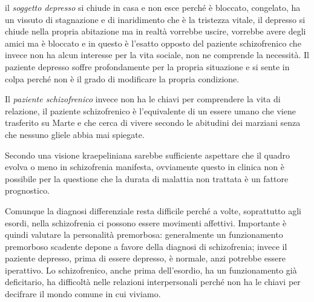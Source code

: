 \documentclass[]{article}
\begin{document}
il \emph{soggetto depresso} si chiude in casa e non esce perché è
bloccato, congelato, ha un vissuto di stagnazione e di inaridimento che
è la tristezza vitale, il depresso si chiude nella propria abitazione ma
in realtà vorrebbe uscire, vorrebbe avere degli amici ma è bloccato e in
questo è l'esatto opposto del paziente schizofrenico che invece non ha
alcun interesse per la vita sociale, non ne comprende la necessità. Il
paziente depresso soffre profondamente per la propria situazione e si
sente in colpa perché non è il grado di modificare la propria
condizione.

Il \emph{paziente schizofrenico} invece non ha le chiavi per comprendere
la vita di relazione, il paziente schizofrenico è l'equivalente di un
essere umano che viene trasferito su Marte e che cerca di vivere secondo
le abitudini dei marziani senza che nessuno gliele abbia mai spiegate.

Secondo una visione kraepeliniana sarebbe sufficiente aspettare che il
quadro evolva o meno in schizofrenia manifesta, ovviamente questo in
clinica non è possibile per la questione che la durata di malattia non
trattata è un fattore prognostico.

Comunque la diagnosi differenziale resta difficile perché a volte,
soprattutto agli esordi, nella schizofrenia ci possono essere movimenti
affettivi. Importante è quindi valutare la personalità premorbosa:
generalmente un funzionamento premorboso scadente depone a favore della
diagnosi di schizofrenia; invece il paziente depresso, prima di essere
depresso, è normale, anzi potrebbe essere iperattivo. Lo schizofrenico,
anche prima dell'esordio, ha un funzionamento già deficitario, ha
difficoltà nelle relazioni interpersonali perché non ha le chiavi per
decifrare il mondo comune in cui viviamo.
\end{document}
